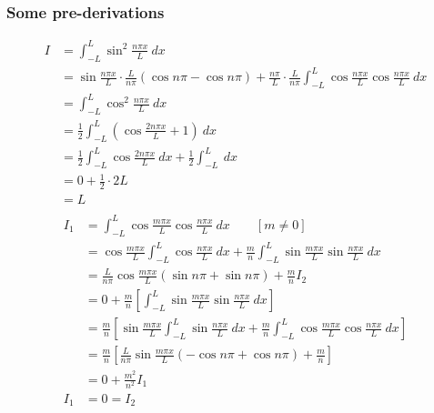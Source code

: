 \documentclass[12pt]{article}
\begin{document}
\subsubsection{Some pre-derivations}

\begin{align*}
    I &= \int_{-L}^{L} {\sin^2{\frac{n\pi x}{L}}} \: d{x} \\
    &= \sin{\frac{n\pi x}{L}} \cdot \frac{L}{n\pi} (\cos{n\pi} - \cos{n\pi}) + \frac{n\pi}{L}\cdot\frac{L}{n\pi} \int_{-L}^{L} {\cos{\frac{n\pi x}{L}}\cos{\frac{n\pi x}{L}}} \: d{x} \\
    &= \int_{-L}^{L} {\cos^2{\frac{n\pi x}{L}}} \: d{x} \\
    &= \frac{1}{2} \int_{-L}^{L} {\left( \cos{\frac{2n\pi x}{L} + 1} \right)} \: d{x} \\
    &= \frac{1}{2} \int_{-L}^{L} {\cos{\frac{2n\pi x}{L}}} \: d{x} + \frac{1}{2} \int_{-L}^{L} {} \: d{x} \\
    &= 0 + \frac{1}{2} \cdot 2L \\
    &= L \\
\end{align*}
\begin{align*}
    I_1 &= \int_{-L}^{L} {\cos{\frac{m\pi x}{L}} \cos{\frac{n\pi x}{L}}} \: d{x} \qquad [m \neq 0] \\
    &= \cos{\frac{m\pi x}{L}} \int_{-L}^{L} {\cos{\frac{n\pi x}{L}}} \: d{x} + \frac{m}{n} \int_{-L}^{L} {\sin{\frac{m\pi x}{L}} \sin{\frac{n\pi x}{L}}} \: d{x} \\
    &= \frac{L}{n\pi} \cos{\frac{m\pi x}{L}} (\sin{n\pi} + \sin{n\pi}) + \frac{m}{n} I_2 \\
    &= 0 + \frac{m}{n} \left[ \int_{-L}^{L} {\sin{\frac{m\pi x}{L}} \sin{\frac{n\pi x}{L}}} \: d{x} \right] \\
    &= \frac{m}{n} \left[ \sin{\frac{m\pi x}{L}} \int_{-L}^{L} {\sin{\frac{n\pi x}{L}}} \: d{x} + \frac{m}{n} \int_{-L}^{L} {\cos{\frac{m\pi x}{L}} \cos{\frac{n\pi x}{L}}} \: d{x} \right] \\
    &= \frac{m}{n} \left[ \frac{L}{n\pi} \sin{\frac{m\pi x}{L}} (-\cos{n\pi} + \cos{n\pi}) + \frac{m}{n} \right] \\
    &= 0 + \frac{m^2}{n^2}I_1 \\
    I_1 &= 0 = I_2
\end{align*}
\end{document}
